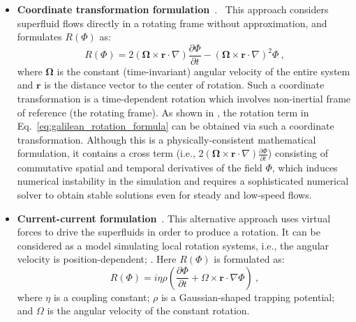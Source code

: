 \documentclass[10pt,journal,compsoc,twoside]{IEEEtran}
\newcommand{\bl}[1]{{\color{black}{#1}}}
\begin{document}
	\begin{itemize}
		
		\vspace*{1mm}
		\item{
			\textbf{Coordinate transformation formulation}~\cite{PRD_14}. \
			This approach \bl{employs coordinate transformation and} considers superfluid flows directly in a rotating frame without approximation, and formulates $R(\Phi)$ as:
			\begin{equation}
				R(\Phi) 
				= 2 (\boldsymbol{\Omega}\times\mathbf{r}\cdot\nabla)\frac{\partial \Phi}{\partial t}-(\boldsymbol{\Omega}\times\mathbf{r}\cdot\nabla)^2\Phi \ ,
				\label{eq:galilean_rotation_formula}
			\end{equation}
			where $\boldsymbol{\Omega}$ is the constant (time-invariant) angular velocity of the entire system and $\mathbf{r}$ is the distance vector to the center of rotation.
			Such a coordinate transformation is a time-dependent rotation which involves non-inertial frame of reference (the rotating frame).
			As shown in \cite{PRD_14}, the rotation term in Eq.~\ref{eq:galilean_rotation_formula} can be obtained via such a coordinate transformation.
			Although this is a physically-consistent mathematical formulation, it contains a cross term (i.e., $2 (\boldsymbol{\Omega}\times\mathbf{r}\cdot\nabla)\frac{\partial \Phi}{\partial t}$) consisting of commutative spatial and temporal derivatives of the field $\Phi$, which induces numerical instability in the simulation and requires a sophisticated numerical solver to obtain stable solutions even for steady and low-speed flows.
			
		}
		
		\vspace*{1mm}
		\item{
			\textbf{Current-current formulation}~\cite{HXZ_14}.
			This alternative approach uses virtual forces to drive the superfluids in order to produce a rotation.
			It can be considered as a model simulating local rotation systems, i.e., the angular velocity is position-dependent; \bl{Although this formulation is not as accurate as the coordinate transformation formulation, stable numerical solutions can be achieved with high computational efficiency}.
			Here $R(\Phi)$ is formulated as:
			\begin{equation}
				R(\Phi) = i\eta\rho \left(\frac{\partial \Phi}{\partial t}+\Omega\times\mathbf{r}\cdot\nabla\Phi\right) \ ,
				\label{eq:current_rotation_formula}
			\end{equation}
			where $\eta$ is a coupling constant;
			$\rho$ is a Gaussian-shaped trapping potential;
			and $\Omega$ is the angular velocity of the constant rotation.
		}
		
	\end{itemize}
	
\end{document}
